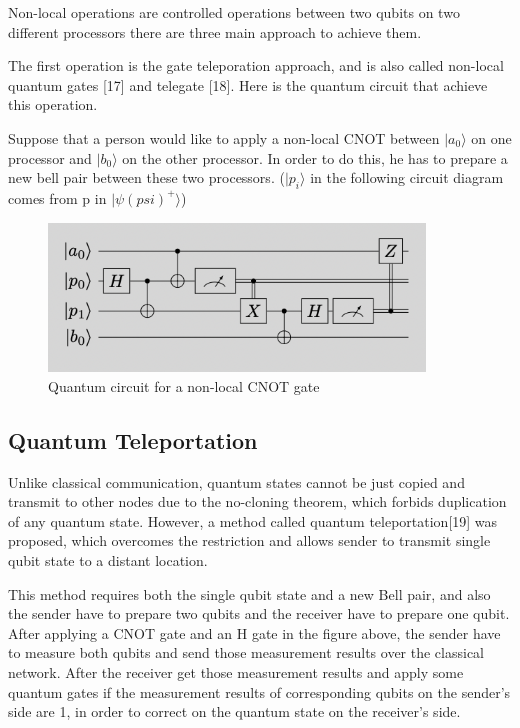 Non-local operations are controlled operations between two qubits on two different processors there are three main approach to achieve them.

The first operation is the gate teleporation approach, and is also called non-local quantum gates [17] and telegate [18].  Here is the quantum circuit that achieve this operation.

Suppose that a person would like to apply a non-local CNOT between $|a_0\rangle$ on one processor and $|b_0\rangle$ on the other processor.  In order to do this, he has to prepare a new bell pair between these two processors.  ($|p_i\rangle$ in the following circuit diagram comes from p in $|\psi (psi)^+\rangle$)

 \begin{figure}[h]
  		\begin{center}
  			\includegraphics[width=10cm]{img/non-local-cnot.png}
			\caption{Quantum circuit for a non-local CNOT gate}
			\label{Fig1}
		\end{center}
	\end{figure}
	
\newpage

\subsection{Quantum Teleportation}

  Unlike classical communication, quantum states cannot be just copied and transmit to other nodes due to the no-cloning theorem, which forbids duplication of any quantum state.  However, a method called quantum teleportation[19] was proposed, which overcomes the restriction and allows sender to transmit single qubit state to a distant location. 
 		
This method requires both the single qubit state and a new Bell pair, and also the sender have to prepare two qubits and the receiver have to prepare one qubit.  After applying a CNOT gate and an H gate in the figure above, the sender have to measure both qubits and send those measurement results over the classical network.  After the receiver get those measurement results and apply some quantum gates if the measurement results of corresponding qubits on the sender's side are 1, in order to correct on the quantum state on the receiver's side.

